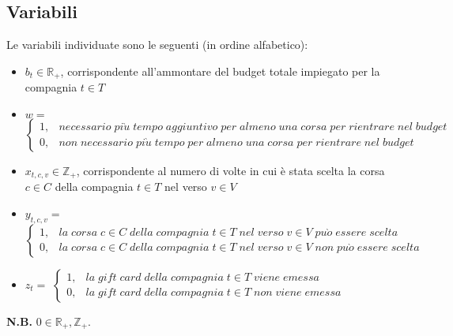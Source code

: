 \documentclass[main.tex]{subfiles}
\begin{document}
\subsection*{Variabili}
Le variabili individuate sono le seguenti (in ordine alfabetico):
\begin{itemize}
    \item $b_t \in \mathbb{R}_+$, corrispondente all'ammontare del budget totale impiegato per la compagnia $t \in T$
    \item $w =$ 
    \begin{math} { \begin{cases}
        1, & necessario\; pi\grave{u}\; tempo\; aggiuntivo\; per\; almeno\; una\; corsa\; per\; rientrare\; nel\; budget \\
        0, & non\; necessario\; pi\grave{u}\; tempo\; per\; almeno\; una\; corsa\; per\; rientrare\; nel\; budget
    \end{cases} } \end{math}
    \item $x_{t,c,v} \in \mathbb{Z}_+$, corrispondente al numero di volte in cui è stata scelta la corsa $c \in C$ della compagnia $t \in T$ nel verso $v \in V$
    \item $y_{t,c,v} =$
    \begin{math} { \begin{cases}
        1, & la\; corsa\; \text{$c \in C$}\; della\; compagnia\; \text{$t \in T$}\; nel\; verso\; \text{$v \in V$}\; pu\grave{o}\; essere\; scelta \\
        0, & la\; corsa\; \text{$c \in C$}\; della\; compagnia\; \text{$t \in T$}\; nel\; verso\; \text{$v \in V$}\; non\; pu\grave{o}\; essere\; scelta
    \end{cases} } \end{math}
    \item $z_t =$
    \begin{math} { \begin{cases}
        1, & la\; gift\; card\; della\; compagnia\; \text{$t \in T$}\; viene\; emessa \\
        0, & la\; gift\; card\; della\; compagnia\; \text{$t \in T$}\; non\; viene\; emessa 
    \end{cases} } \end{math}
\end{itemize}
\textbf{N.B.} $0 \in \mathbb{R}_+, \mathbb{Z}_+$.
\end{document}

